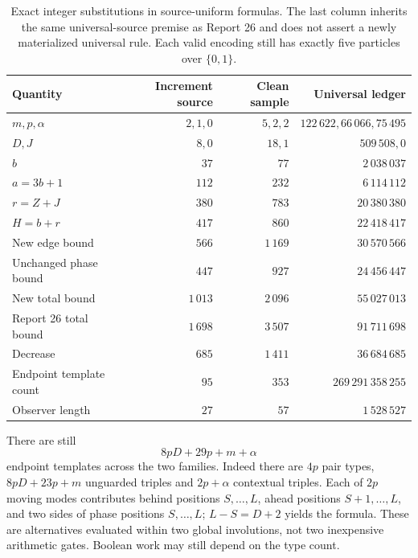 \documentclass[11pt,a4paper]{article}
\numberwithin{equation}{section}
\begin{document}
\begin{table}[htbp]
\centering\small
\begin{tabular}{lrrr}\toprule
Quantity & Increment source & Clean sample & Universal ledger\\\midrule
$m,p,\alpha$ & $2,1,0$ & $5,2,2$ & $122\,622,66\,066,75\,495$\\
$D,J$ & $8,0$ & $18,1$ & $509\,508,0$\\
$b$ & $37$ & $77$ & $2\,038\,037$\\
$a=3b+1$ & $112$ & $232$ & $6\,114\,112$\\
$r=Z+J$ & $380$ & $783$ & $20\,380\,380$\\
$H=b+r$ & $417$ & $860$ & $22\,418\,417$\\
New edge bound & $566$ & $1\,169$ & $30\,570\,566$\\
Unchanged phase bound & $447$ & $927$ & $24\,456\,447$\\
New total bound & $1\,013$ & $2\,096$ & $55\,027\,013$\\
Report 26 total bound & $1\,698$ & $3\,507$ & $91\,711\,698$\\
Decrease & $685$ & $1\,411$ & $36\,684\,685$\\
Endpoint template count & $95$ & $353$ & $269\,291\,358\,255$\\
Observer length & $27$ & $57$ & $1\,528\,527$\\\bottomrule
\end{tabular}
\caption{Exact integer substitutions in source-uniform formulas. The last column inherits the same universal-source premise as Report 26 and does not assert a newly materialized universal rule. Each valid encoding still has exactly five particles over $\{0,1\}$.}
\label{fpa:tr:tab:ledger}
\end{table}

There are still
\begin{equation}\label{fpa:tr:eq:types}
8pD+29p+m+\alpha
\end{equation}
endpoint templates across the two families. Indeed there are $4p$ pair types, $8pD+23p+m$ unguarded triples and $2p+\alpha$ contextual triples. Each of $2p$ moving modes contributes behind positions $S,\ldots,L$, ahead positions $S+1,\ldots,L$, and two sides of phase positions $S,\ldots,L$; $L-S=D+2$ yields the formula. These are alternatives evaluated within two global involutions, not two inexpensive arithmetic gates. Boolean work may still depend on the type count.
\end{document}
